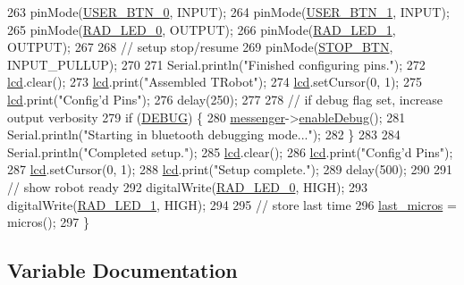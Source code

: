 \begin{DoxyCode}
263     pinMode(\hyperlink{config_8h_ad1b75624b64bd61940398308fbe959de}{USER\_BTN\_0}, INPUT);
264     pinMode(\hyperlink{config_8h_aaa59272336b5c18e23ce7ca1b9bb4f6e}{USER\_BTN\_1}, INPUT);
265     pinMode(\hyperlink{config_8h_ae7a4f981c8c2fee871cca8ce6de40436}{RAD\_LED\_0}, OUTPUT);
266     pinMode(\hyperlink{config_8h_a4fdb8eb7f018736d83447712b34a6438}{RAD\_LED\_1}, OUTPUT);
267 
268     \textcolor{comment}{// setup stop/resume}
269     pinMode(\hyperlink{config_8h_a1ade4e9e2443ae4e04802648cbf634af}{STOP\_BTN}, INPUT\_PULLUP);
270 
271     Serial.println(\textcolor{stringliteral}{"Finished configuring pins."});
272     \hyperlink{rbe2001_8ino_a4cbb289153633c01a1584b3aa0d9a0a2}{lcd}.clear();
273     \hyperlink{rbe2001_8ino_a4cbb289153633c01a1584b3aa0d9a0a2}{lcd}.print(\textcolor{stringliteral}{"Assembled TRobot"});
274     \hyperlink{rbe2001_8ino_a4cbb289153633c01a1584b3aa0d9a0a2}{lcd}.setCursor(0, 1);
275     \hyperlink{rbe2001_8ino_a4cbb289153633c01a1584b3aa0d9a0a2}{lcd}.print(\textcolor{stringliteral}{"Config'd Pins"});
276     delay(250);
277 
278     \textcolor{comment}{// if debug flag set, increase output verbosity}
279     \textcolor{keywordflow}{if} (\hyperlink{config_8h_ad72dbcf6d0153db1b8d8a58001feed83}{DEBUG}) \{
280         \hyperlink{rbe2001_8ino_a48342badc24a04d2310ca16ff4a3711b}{messenger}->\hyperlink{class_messenger_a6cb2c50700cc4b8824c7f6b07a3216ff}{enableDebug}();
281         Serial.println(\textcolor{stringliteral}{"Starting in bluetooth debugging mode..."});
282     \}
283 
284     Serial.println(\textcolor{stringliteral}{"Completed setup."});
285     \hyperlink{rbe2001_8ino_a4cbb289153633c01a1584b3aa0d9a0a2}{lcd}.clear();
286     \hyperlink{rbe2001_8ino_a4cbb289153633c01a1584b3aa0d9a0a2}{lcd}.print(\textcolor{stringliteral}{"Config'd Pins"});
287     \hyperlink{rbe2001_8ino_a4cbb289153633c01a1584b3aa0d9a0a2}{lcd}.setCursor(0, 1);
288     \hyperlink{rbe2001_8ino_a4cbb289153633c01a1584b3aa0d9a0a2}{lcd}.print(\textcolor{stringliteral}{"Setup complete."});
289     delay(500);
290 
291     \textcolor{comment}{// show robot ready}
292     digitalWrite(\hyperlink{config_8h_ae7a4f981c8c2fee871cca8ce6de40436}{RAD\_LED\_0}, HIGH);
293     digitalWrite(\hyperlink{config_8h_a4fdb8eb7f018736d83447712b34a6438}{RAD\_LED\_1}, HIGH);
294 
295     \textcolor{comment}{// store last time}
296     \hyperlink{rbe2001_8ino_aa06e377d25b7ca134c27aea3e6c46235}{last\_micros} = micros();
297 \}
\end{DoxyCode}


\subsection{Variable Documentation}
\mbox{\label{rbe2001_8ino_a40e268acbd6a40e1d49f995404b85d0b}} 
